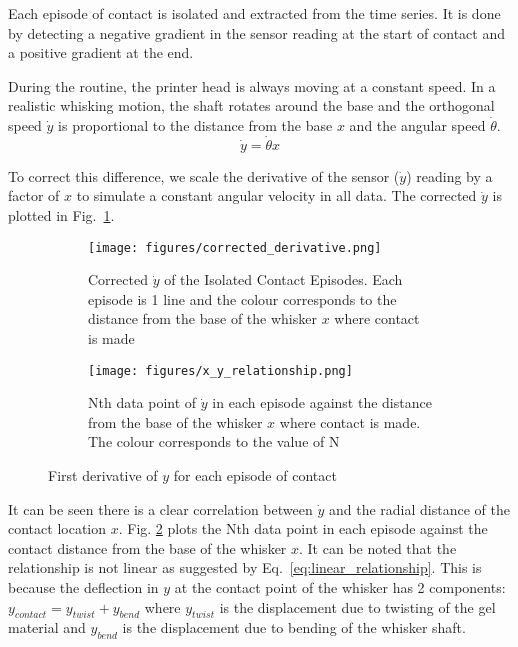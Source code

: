 \documentclass[runningheads]{llncs}
\begin{document}
Each episode of contact is isolated and extracted from the time series. It is done by detecting a negative gradient in the sensor reading at the start of contact and a positive gradient at the end. 

During the routine, the printer head is always moving at a constant speed. In a realistic whisking motion, the shaft rotates around the base and the orthogonal speed \(\dot{y}\) is proportional to the distance from the base \(x\) and the angular speed \(\dot{\theta}\).
\begin{equation}\label{eq:linear_relationship}
\dot{y} = \dot{\theta}x
\end{equation}

To correct this difference, we scale the derivative of the sensor (\(\dot{y}\)) reading by a factor of \(x\) to simulate a constant angular velocity in all data. The corrected \(\dot{y}\) is plotted in Fig.~\ref{fig:corrected_derivative.png}.

\begin{figure}
    \centering
    \begin{subfigure}[t]{.49\textwidth}
        \centering
        \texttt{[image: figures/corrected\_derivative.png]}
        \caption{Corrected \(\dot{y}\) of the Isolated Contact Episodes. Each episode is 1 line and the colour corresponds to the distance from the base of the whisker \(x\) where contact is made}
        \label{fig:corrected_derivative.png}
    \end{subfigure}
    \hspace{1pt}
    \begin{subfigure}[t]{.49\textwidth}
        \centering
        \texttt{[image: figures/x\_y\_relationship.png]}
        \caption{Nth data point of \(\dot{y}\) in each episode against the distance from the base of the whisker \(x\) where contact is made. The colour corresponds to the value of N}
        \label{fig:x_y_relationship.png}
    \end{subfigure}
    \vspace{-5pt}
    \caption{First derivative of \(y\) for each episode of contact}
    \label{fig:episode_analysis}
\end{figure}


It can be seen there is a clear correlation between \(\dot{y}\) and the radial distance of the contact location \(x\). Fig. \ref*{fig:x_y_relationship.png} plots the Nth data point in each episode against the contact distance from the base of the whisker \(x\). It can be noted that the relationship is not linear as suggested by Eq.~\ref*{eq:linear_relationship}. This is because the deflection in \(y\) at the contact point of the whisker has 2 components: \(y_{contact} = y_{twist} + y_{bend}\) where \(y_{twist}\) is the displacement due to twisting of the gel material and \(y_{bend}\) is the displacement due to bending of the whisker shaft.
\end{document}
